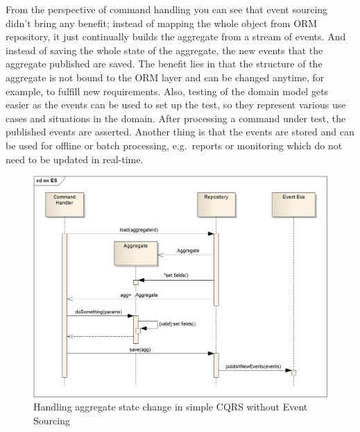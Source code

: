 \documentclass{book}
\begin{document}
From the perspective of command handling you can see that event sourcing
didn't bring any benefit; instead of mapping the whole object from ORM
repository, it just continually builds the aggregate from a stream of
events. And instead of saving the whole state of the aggregate, the new
events that the aggregate published are saved. The benefit lies in that
the structure of the aggregate is not bound to the ORM layer and can be
changed anytime, for example, to fulfill new requirements. Also, testing
of the domain model gets easier as the events can be used to set up the
test, so they represent various use cases and situations in the domain.
After processing a command under test, the published events are
asserted. Another thing is that the events are stored and can be used
for offline or batch processing, e.g.~reports or monitoring which do not
need to be updated in real-time.


\begin{figure}[h!]
\begin{center}
\includegraphics[width=0.98\columnwidth]{figures/cqrs-no-es/cqrs-no-es}
\caption{Handling aggregate state change in simple CQRS without Event Sourcing%
}
\end{center}
\end{figure}
\end{document}
